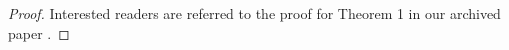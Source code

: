 \documentclass[12pt, conference, a4paper, twoside]{IEEEconf_mod}
\newtheorem{lem}{\bf{Lemma}}
\begin{document}

\begin{proof} Interested readers are referred to the proof for Theorem 1 in our archived paper \cite{Chang_Qie}.

%
\end{proof}

\end{document}
